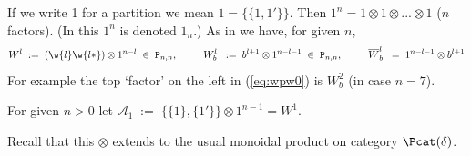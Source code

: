 \documentclass[reqno,10pt,a4paper]{amsart}
\newcommand{\U}{\mathcal{U}}
\newcommand{\rb}[2]{\raisebox{#1}{#2}}
\newcommand{\ig}{\includegraphics}
\newcommand{\beq}{\begin{equation}}
\newcommand{\eq}{\end{equation}}
\newcommand{\blue}[1]{\textcolor{blue}{#1}}
\newcommand{\red}[1]{\textcolor{red}{#1}}
\newcommand{\ppm}[1]{\red{#1}}
\newcommand{\ca}[1]{\blue{#1}}
\newcommand{\rmP}{{\mathtt P}} %
\begin{document}
\newcommand{\W}{{\mathcal W}} %
\newcommand{\A}{{\mathcal A}}  %
\newcommand{\one}[1]{1^{#1}}  %

If we write 1 for a partition we mean 
$1=\{\{1,1'\}\}$. 
Then $\one{n} = 1\otimes 1 \otimes ...\otimes 1$ ($n$ factors). 
(In \cite{amm2019tonal} this $\one{n}$ is denoted $1_n$.)  
%
As in \cite[(3.8)]{amm2019tonal} we have, for given $n$,
\[
W^l \; := \; \left( \w{l} \w{l*}  \right) \otimes \one{n-l}
\; \in \; \rmP_{n,n},
\hspace{.9cm}
W_b^l \; \; := \;  b^{l+1}   \otimes 1^{n-l-1}
\; \in \; \rmP_{n,n}   ,
\hspace{.9cm}
\overline{W}_b^l \; \; = \;   1^{n-l-1}   \otimes b^{l+1}  
\]
For example the top `factor' on the left in (\ref{eq:wpw0}) is $W_b^2$ 
(in case $n=7$). 




For given $n>0$ let 
$\A_1 \; := \; \{\{1\},\{1'\}\}\otimes 1^{n-1} =W^1$.

\mdef
Recall that 
this 
$\otimes$  extends to  %
the usual 
monoidal product on category $\Pcat(\delta)$. 




\end{document}
